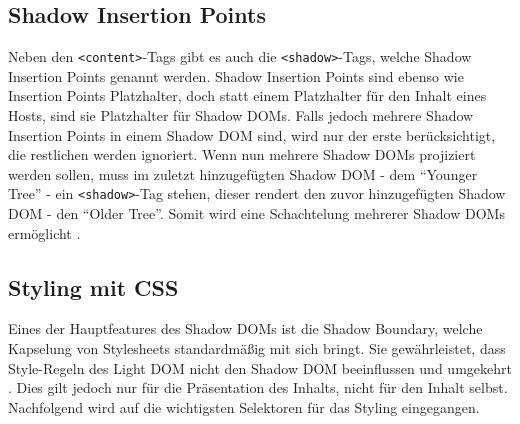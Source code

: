 \subsection{Shadow Insertion Points}\label{shadow-insertion-points}

Neben den \texttt{\textless{}content\textgreater{}}-Tags gibt es auch die \texttt{\textless{}shadow\textgreater{}}-Tags, welche Shadow Insertion Points genannt werden. Shadow Insertion Points sind ebenso wie Insertion Points Platzhalter, doch statt einem Platzhalter für den Inhalt eines Hosts, sind sie Platzhalter für Shadow \ac{DOM}s. Falls jedoch mehrere Shadow Insertion Points in einem Shadow \ac{DOM} sind, wird nur der erste berücksichtigt, die restlichen werden ignoriert. Wenn nun mehrere Shadow \ac{DOM}s projiziert werden sollen, muss im zuletzt hinzugefügten Shadow \ac{DOM} - dem ``Younger Tree'' - ein \texttt{\textless{}shadow\textgreater{}}-Tag stehen, dieser rendert den zuvor hinzugefügten Shadow \ac{DOM} - den ``Older Tree''. Somit wird eine Schachtelung mehrerer Shadow \ac{DOM}s ermöglicht \cite{citeulike:13851421}.

\subsection{Styling mit CSS}\label{styling-mit-css}

Eines der Hauptfeatures des Shadow \ac{DOM}s ist die Shadow Boundary, welche Kapselung von Stylesheets standardmäßig mit sich bringt. Sie gewährleistet, dass Style-Regeln des Light \ac{DOM} nicht den Shadow \ac{DOM} beeinflussen und umgekehrt \cite{citeulike:13851334}. Dies gilt jedoch nur für die Präsentation des Inhalts, nicht für den Inhalt selbst. Nachfolgend wird auf die wichtigsten Selektoren für das Styling eingegangen.

